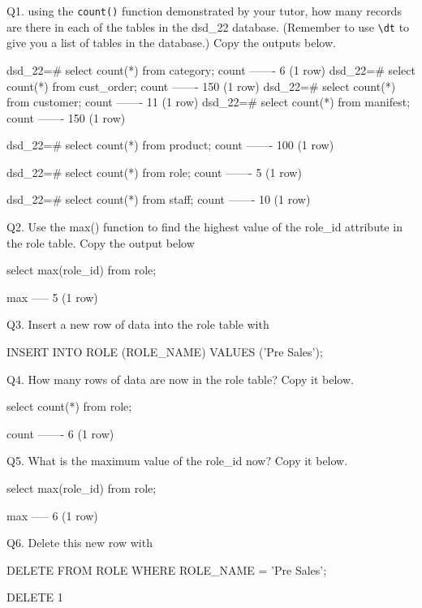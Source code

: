 
Q1. using the \verb|count()| function demonstrated by your tutor, how many records are there in each of the tables in the dsd\_22 database. (Remember to use \verb|\dt| to give you a list of tables in the database.) Copy the outputs below.

\begin{pseudo*}
dsd_22=# select count(*) from category;
count
-------
    6
(1 row)
dsd_22=# select count(*) from cust_order;
count
-------
150
(1 row)
dsd_22=# select count(*) from customer;
count
-------
11
(1 row)
dsd_22=# select count(*) from manifest;
count
-------
150
(1 row)

dsd_22=# select count(*) from product;
count 
-------
100
(1 row)

dsd_22=# select count(*) from role;
count
-------
    5
(1 row)

dsd_22=# select count(*) from staff;
count 
-------
10
(1 row)
\end{pseudo*}

Q2. Use the max() function to find the highest value of the role\_id attribute in the role table. Copy the output below
\begin{sql}
select max(role_id) from role;
\end{sql}
\begin{pseudo*}
max 
-----
    5
(1 row)
\end{pseudo*}

Q3. Insert a new row of data into the role table with 
\begin{sql}
INSERT INTO ROLE (ROLE_NAME) VALUES ('Pre Sales'); 
\end{sql}

Q4. How many rows of data are now in the role table? Copy it below.
\begin{sql}
select count(*) from role;
\end{sql}
\begin{pseudo*}
count
-------
    6
(1 row)
\end{pseudo*}

Q5. What is the maximum value of the role\_id now? Copy it below.
\begin{sql}
select max(role_id) from role;
\end{sql}
\begin{pseudo*}
max 
-----
    6
(1 row)
\end{pseudo*}

Q6. Delete this new row with  
\begin{sql}
DELETE FROM ROLE WHERE ROLE_NAME = 'Pre Sales'; 
\end{sql}
\begin{pseudo*}
DELETE 1
\end{pseudo*}

